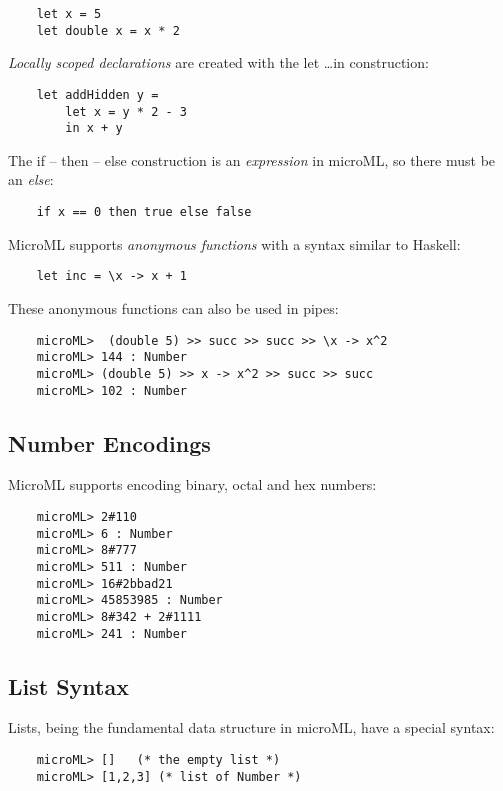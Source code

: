 \begin{verbatim}
    let x = 5
    let double x = x * 2
\end{verbatim}

\textit{Locally scoped declarations} are created with the let \dots in construction:

\begin{verbatim}
    let addHidden y = 
        let x = y * 2 - 3 
        in x + y
\end{verbatim}

The if -- then -- else construction is an \textit{expression} in microML, so there must be an
\textit{else}:

\begin{verbatim}
    if x == 0 then true else false
\end{verbatim}

MicroML supports \textit{anonymous functions} with a syntax similar to Haskell:

\begin{verbatim}
    let inc = \x -> x + 1
\end{verbatim}

These anonymous functions can also be used in pipes:

\begin{verbatim}
    microML>  (double 5) >> succ >> succ >> \x -> x^2
    microML> 144 : Number
    microML> (double 5) >> x -> x^2 >> succ >> succ
    microML> 102 : Number
\end{verbatim}

\subsection{Number Encodings}
\label{encodings}
MicroML supports encoding binary, octal and hex numbers:

\begin{verbatim}
    microML> 2#110
    microML> 6 : Number
    microML> 8#777
    microML> 511 : Number
    microML> 16#2bbad21
    microML> 45853985 : Number
    microML> 8#342 + 2#1111
    microML> 241 : Number
\end{verbatim}

\subsection{List Syntax}
Lists, being the fundamental data structure in microML, have a special syntax:

\begin{verbatim}
    microML> []   (* the empty list *)
    microML> [1,2,3] (* list of Number *)
\end{verbatim}


